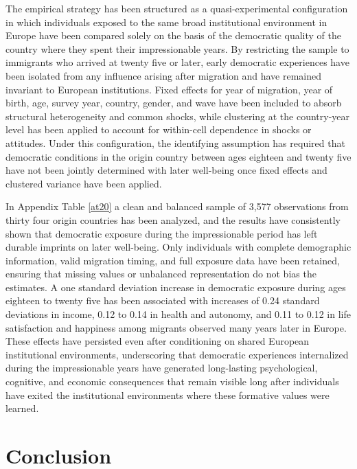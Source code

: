 \documentclass[11pt]{article}
\begin{document}
The empirical strategy has been structured as a quasi-experimental configuration in which individuals exposed to the same broad institutional environment in Europe have been compared solely on the basis of the democratic quality of the country where they spent their impressionable years. By restricting the sample to immigrants who arrived at twenty five or later, early democratic experiences have been isolated from any influence arising after migration and have remained invariant to European institutions. Fixed effects for year of migration, year of birth, age, survey year, country, gender, and wave have been included to absorb structural heterogeneity and common shocks, while clustering at the country-year level has been applied to account for within-cell dependence in shocks or attitudes. Under this configuration, the identifying assumption has required that democratic conditions in the origin country between ages eighteen and twenty five have not been jointly determined with later well-being once fixed effects and clustered variance have been applied.

In Appendix Table \ref{at20} a clean and balanced sample of 3,577 observations from thirty four origin countries has been analyzed, and the results have consistently shown that democratic exposure during the impressionable period has left durable imprints on later well-being. Only individuals with complete demographic information, valid migration timing, and full exposure data have been retained, ensuring that missing values or unbalanced representation do not bias the estimates. A one standard deviation increase in democratic exposure during ages eighteen to twenty five has been associated with increases of 0.24 standard deviations in income, 0.12 to 0.14 in health and autonomy, and 0.11 to 0.12 in life satisfaction and happiness among migrants observed many years later in Europe. These effects have persisted even after conditioning on shared European institutional environments, underscoring that democratic experiences internalized during the impressionable years have generated long-lasting psychological, cognitive, and economic consequences that remain visible long after individuals have exited the institutional environments where these formative values were learned.



\vspace*{0.5cm}
\section{Conclusion}\label{Conclusion}
\vspace*{0.5cm}
\end{document}
